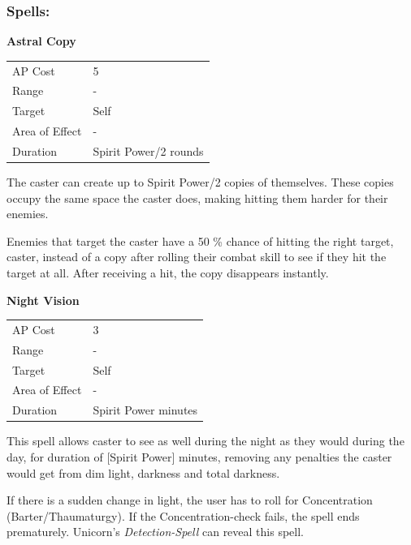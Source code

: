 \documentclass[11pt,a4paper,twocolumn]{book}
\begin{document}
\subsubsection*{Spells:}

\smallskip
\noindent
\textbf{Astral Copy}

\smallskip
{
	\begin{tabu} to 70mm{| X[l,4] | X[l,7] |}
		\hline
        AP Cost	      	& 5 						\\
        Range     		& -				\\
        Target      	& Self		\\
        Area of Effect  & -  	 			\\
        Duration     	& Spirit Power/2 rounds		\\ \hline
	\end{tabu}
		
}
\smallskip

The caster can create up to Spirit Power/2 copies of themselves. These copies occupy the same space the caster does, making hitting them harder for their enemies. 

Enemies that target the caster have a 50 \% chance of hitting the right target, caster, instead of a copy after rolling their combat skill to see if they hit the target at all. After receiving a hit, the copy disappears instantly.

\bigskip
\noindent
\textbf{Night Vision}

\smallskip
{
	\begin{tabu} to 70mm{| X[l,4] | X[l,7] |}
		\hline
        AP Cost	      	& 3 						\\
        Range     		& -				\\
        Target      	& Self		\\
        Area of Effect  & -  	 			\\
        Duration     	& Spirit Power minutes		\\ \hline
	\end{tabu}
		
}

This spell allows caster to see as well during the night as they would during the day, for duration of [Spirit Power] minutes, removing any penalties the caster would get from dim light, darkness and total darkness. 

If there is a sudden change in light, the user has to roll for Concentration (Barter/Thaumaturgy). If the Concentration-check fails, the spell ends prematurely. Unicorn's \textit{Detection-Spell} can reveal this spell.
\end{document}
